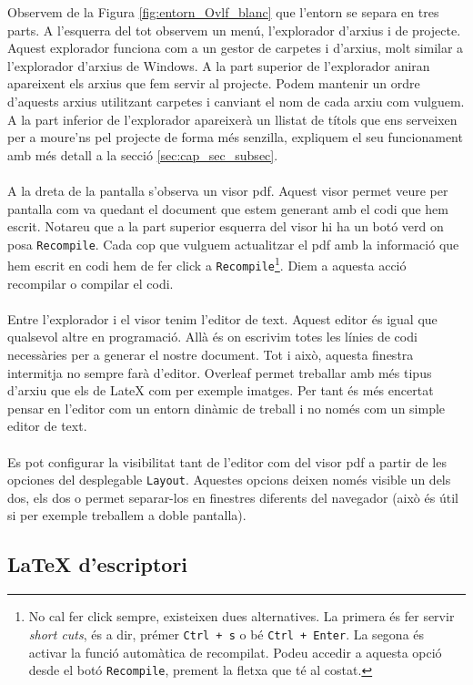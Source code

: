 \documentclass[15pt,twosides,onecolumn,openany]{book}
\begin{document}
\noindent Observem de la Figura \ref{fig:entorn_Ovlf_blanc} que l'entorn se separa en tres parts. A l'esquerra del tot observem un menú, l'explorador d'arxius i de projecte. Aquest explorador funciona com a un gestor de carpetes i d'arxius, molt similar a l'explorador d'arxius de Windows. A la part superior de l'explorador aniran apareixent els arxius que fem servir al projecte. Podem mantenir un ordre d'aquests arxius utilitzant carpetes i canviant el nom de cada arxiu com vulguem. A la part inferior de l'explorador apareixerà un llistat de títols que ens serveixen per a moure'ns pel projecte de forma més senzilla, expliquem el seu funcionament amb més detall a la secció \ref{sec:cap_sec_subsec}.\\\\
A la dreta de la pantalla s'observa un visor pdf. Aquest visor permet veure per pantalla com va quedant el document que estem generant amb el codi que hem escrit. Notareu que a la part superior esquerra del visor hi ha un botó verd on posa \texttt{Recompile}. Cada cop que vulguem actualitzar el pdf amb la informació que hem escrit en codi hem de fer click a \texttt{Recompile}\footnote{No cal fer click sempre, existeixen dues alternatives. La primera és fer servir \textit{short cuts}, és a dir, prémer \texttt{Ctrl + s} o bé \texttt{Ctrl + Enter}. La segona és activar la funció automàtica de recompilat. Podeu accedir a aquesta opció desde el botó \texttt{Recompile}, prement la fletxa que té al costat.}. Diem a aquesta acció recompilar o compilar el codi.\\\\
Entre l'explorador i el visor tenim l'editor de text. Aquest editor és igual que qualsevol altre en programació. Allà és on escrivim totes les línies de codi necessàries per a generar el nostre document. Tot i això, aquesta finestra intermitja no sempre farà d'editor. Overleaf permet treballar amb més tipus d'arxiu que els de LateX com per exemple imatges. Per tant és més encertat pensar en l'editor com un entorn dinàmic de treball i no només com un simple editor de text.\\\\
Es pot configurar la visibilitat tant de l'editor com del visor pdf a partir de les opciones del desplegable \texttt{Layout}. Aquestes opcions deixen només visible un dels dos, els dos o permet separar-los en finestres diferents del navegador (això és útil si per exemple treballem a doble pantalla).
\subsection{LaTeX d'escriptori}
\end{document}
